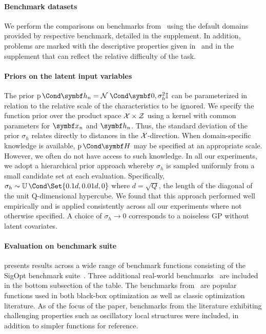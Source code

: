 \paragraph{Benchmark datasets}
We perform the comparisons on benchmarks from~\parencite{mccourt_optimization_2016,head_scikit-optimize_2018} using the default domains provided by respective benchmark, detailed in the supplement.
In addition, problems are marked with the descriptive properties given in~\parencite{mccourt_optimization_2016} and in the supplement that can reflect the relative difficulty of the task.

\paragraph{Priors on the latent input variables}
The prior $\Prob{\mat{h}_n} = \Gaussian{\mat{0}, \sigma_h^2\mathbb{I}}$ can be parameterized in relation to the relative scale of the characteristics to be ignored.
We specify the function prior over the product space $\mathcal{X} \times \mathcal{Z}$ using a kernel with common parameters for $\mat{x}_n$ and $\mat{h}_n$.
Thus, the standard deviation of the prior $\sigma_h$ relates directly to distances in the $\mathcal{X}$-direction.
When domain-specific knowledge is available, $\Prob{\mat{H}}$ may be specified at an appropriate scale.
However, we often do not have access to such knowledge.
In all our experiments, we adopt a hierarchical prior approach whereby $\sigma_h$ is sampled uniformly from a small candidate set at each evaluation.
Specifically, $\sigma_h \sim \Uniform{\Set{0.1 d, 0.01 d, 0}}$ where $d = \sqrt{Q}$, the length of the diagonal of the unit Q-dimensional hypercube.
We found that this approach performed well empirically and is applied consistently across all our experiments where not otherwise specified.
A choice of $\sigma_h \to 0$ corresponds to a noiseless GP without latent covariates.

\paragraph{Evaluation on benchmark suite}
 presents results across a wide range of benchmark functions consisting of the SigOpt benchmark suite~\parencite{mccourt_optimization_2016}.
Three additional real-world benchmarks~\parencite{head_scikit-optimize_2018,malkomes_automating_2018,kaelbling_learning_2017} are included in the bottom subsection of the table.
The benchmarks from~\parencite{mccourt_optimization_2016} are popular functions used in both black-box optimization as well as classic optimization literature.
As of the focus of the paper, benchmarks from the literature exhibiting challenging properties such as oscillatory local structures were included,
in addition to simpler functions for reference.

